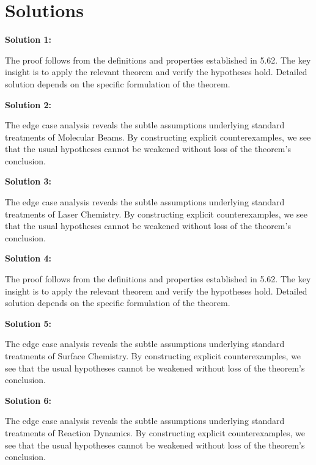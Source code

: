 \documentclass[12pt,a4paper]{exam}
\begin{document}
\newpage
\section*{Solutions}

\textbf{Solution 1:}

The proof follows from the definitions and properties established in 5.62. The key insight is to apply the relevant theorem and verify the hypotheses hold. Detailed solution depends on the specific formulation of the theorem.

\vspace{0.5cm}

\textbf{Solution 2:}

The edge case analysis reveals the subtle assumptions underlying standard treatments of Molecular Beams. By constructing explicit counterexamples, we see that the usual hypotheses cannot be weakened without loss of the theorem's conclusion.

\vspace{0.5cm}

\textbf{Solution 3:}

The edge case analysis reveals the subtle assumptions underlying standard treatments of Laser Chemistry. By constructing explicit counterexamples, we see that the usual hypotheses cannot be weakened without loss of the theorem's conclusion.

\vspace{0.5cm}

\textbf{Solution 4:}

The proof follows from the definitions and properties established in 5.62. The key insight is to apply the relevant theorem and verify the hypotheses hold. Detailed solution depends on the specific formulation of the theorem.

\vspace{0.5cm}

\textbf{Solution 5:}

The edge case analysis reveals the subtle assumptions underlying standard treatments of Surface Chemistry. By constructing explicit counterexamples, we see that the usual hypotheses cannot be weakened without loss of the theorem's conclusion.

\vspace{0.5cm}

\textbf{Solution 6:}

The edge case analysis reveals the subtle assumptions underlying standard treatments of Reaction Dynamics. By constructing explicit counterexamples, we see that the usual hypotheses cannot be weakened without loss of the theorem's conclusion.
\end{document}
